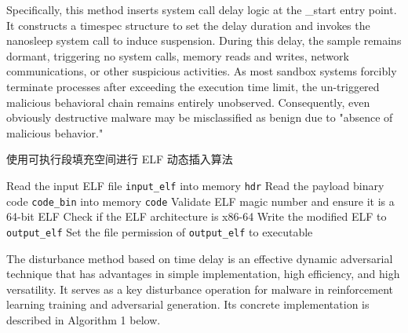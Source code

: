 Specifically, this method inserts system call delay logic at the \_start entry point. It constructs a timespec structure to set the delay duration and invokes the nanosleep system call to induce suspension. During this delay, the sample remains dormant, triggering no system calls, memory reads and writes, network communications, or other suspicious activities. As most sandbox systems forcibly terminate processes after exceeding the execution time limit, the un-triggered malicious behavioral chain remains entirely unobserved. Consequently, even obviously destructive malware may be misclassified as benign due to "absence of malicious behavior."

\begin{algorithm}[htbp]
	\caption{使用可执行段填充空间进行 ELF 动态插入算法}
	Read the input ELF file \texttt{input\_elf} into memory \texttt{hdr}\;
	Read the payload binary code \texttt{code\_bin} into memory \texttt{code}\;
	Validate ELF magic number and ensure it is a 64-bit ELF\;
	Check if the ELF architecture is x86-64\;
	Write the modified ELF to \texttt{output\_elf}\;
	Set the file permission of \texttt{output\_elf} to executable\;
\end{algorithm}

The disturbance method based on time delay is an effective dynamic adversarial technique that has advantages in simple implementation, high efficiency, and high versatility. It serves as a key disturbance operation for malware in reinforcement learning training and adversarial generation. Its concrete implementation is described in Algorithm 1 below.

